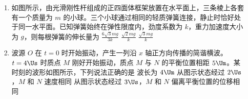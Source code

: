 \documentclass[\gkver]{gaokaozhenti}
\begin{document}
\begin{enumerate}
{图乙中金属棒转动 $\pi$ 为一个周期，则有 $T_{\text{乙}} = \frac{\pi}{2\omega}$

则有 $T_{\text{乙}} = \frac{1}{4}T_{\text{甲}}$

根据题意可知，甲、乙图中产生的交流电均为矩形交流电且正负最大电动势相等，则有

\[ E_{\text{甲}m} = B_{0}L \cdot \frac{0 + \omega L}{2} = \frac{1}{2}B_{0}\omega L^{2} \]

\[ E_{\text{乙}m} = 4B_{0}L \cdot \frac{0 + 2\omega L}{2} = 4B_{0}\omega L^{2} \]

作出图像，如图所示


可知甲、乙图中产生的交流电的有效值为 $E_{\text{甲}} = E_{\text{甲}m} = \frac{1}{2}B_{0}\omega L^{2}$，$E_{\text{乙}} = E_{\text{乙}m} = 4B_{0}\omega L^{2}$

则有 $E_{\text{乙}} = 8E_{\text{甲}}$

故选 D。
}

\item
如图所示，由光滑刚性杆组成的正四面体框架放置在水平面上，三条棱上各套有一个质量为 $m$ 的小球。三个小球通过相同的轻质弹簧连接，静止时恰好处于同一水平面。已知弹簧始终在弹性限度内，劲度系数为 $k$，重力加速度大小为 $g$，则每根弹簧的伸长量为 
{$\frac{6\sqrt{3}mg}{3k}$}
{$\frac{\sqrt{2}mg}{k}$}
{$\frac{\sqrt{3}mg}{k}$}

\item
波源 $O$ 在 $t = 0$ 时开始振动，产生一列沿 $x$ 轴正方向传播的简谐横波。$t = 4\Us$ 时质点 $M$ 刚好开始振动，质点 $M$ 与 $N$ 的平衡位置相距 $5\Um$。某时刻的波形如图所示，下列说法正确的是 
\onepicture[w=5.43cm]{}
{波长为 $4\Um$}
{从图示状态经过 $2\Us$，$M$ 和 $N$ 速度相同}
{从图示状态经过 $3\Us$，$M$ 和 $N$ 偏离平衡位置的位移相同}
\end{enumerate}
\end{document}
